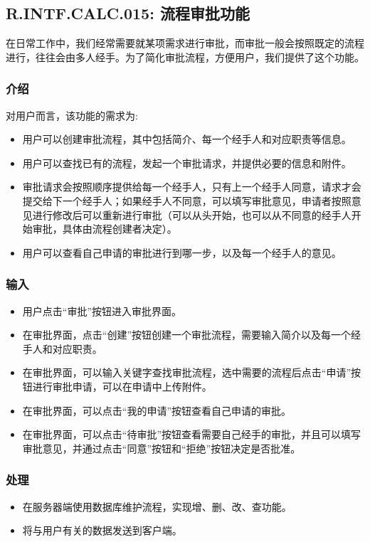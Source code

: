 {\color{red}

\subsection{\color{red}R.INTF.CALC.015: 流程审批功能}
在日常工作中，我们经常需要就某项需求进行审批，而审批一般会按照既定的流程进行，往往会由多人经手。为了简化审批流程，方便用户，我们提供了这个功能。
\subsubsection{介绍}
对用户而言，该功能的需求为:
\begin{itemize}
  \item 用户可以创建审批流程，其中包括简介、每一个经手人和对应职责等信息。
  \item 用户可以查找已有的流程，发起一个审批请求，并提供必要的信息和附件。
  \item 审批请求会按照顺序提供给每一个经手人，只有上一个经手人同意，请求才会提交给下一个经手人；如果经手人不同意，可以填写审批意见，申请者按照意见进行修改后可以重新进行审批（可以从头开始，也可以从不同意的经手人开始审批，具体由流程创建者决定）。
  \item 用户可以查看自己申请的审批进行到哪一步，以及每一个经手人的意见。
\end{itemize}
\subsubsection{输入}
\begin{itemize}
  \item 用户点击“审批”按钮进入审批界面。
  \item 在审批界面，点击“创建”按钮创建一个审批流程，需要输入简介以及每一个经手人和对应职责。
  \item 在审批界面，可以输入关键字查找审批流程，选中需要的流程后点击“申请”按钮进行审批申请，可以在申请中上传附件。
  \item 在审批界面，可以点击“我的申请”按钮查看自己申请的审批。
  \item 在审批界面，可以点击“待审批”按钮查看需要自己经手的审批，并且可以填写审批意见，并通过点击“同意”按钮和“拒绝”按钮决定是否批准。
\end{itemize}
\subsubsection{处理}
\begin{itemize}
  \item 在服务器端使用数据库维护流程，实现增、删、改、查功能。
  \item 将与用户有关的数据发送到客户端。
\end{itemize}
}

